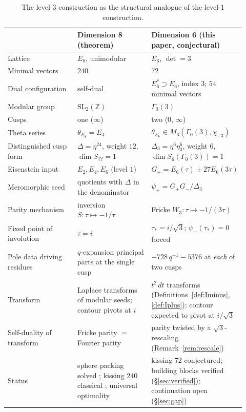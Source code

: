 \documentclass[11pt,reqno]{amsart}
\theoremstyle{plain}
\theoremstyle{definition}
\theoremstyle{remark}
\newcommand{\Z}{\mathbb{Z}}
\newcommand{\Dthree}{\Delta_{3}}
\newcommand{\psip}{\psi_{+}}
\begin{document}
\begin{table}[ht]
\centering
\small
\begin{tabular}{>{\raggedright\arraybackslash}p{0.30\linewidth}
                >{\raggedright\arraybackslash}p{0.32\linewidth}
                >{\raggedright\arraybackslash}p{0.30\linewidth}}
\toprule
 & \textbf{Dimension 8} (theorem) & \textbf{Dimension 6} (this paper,
conjectural) \\
\midrule
Lattice & $E_8$, unimodular & $E_6$, $\det=3$ \\
Minimal vectors & $240$ & $72$ \\
Dual configuration & self-dual & $E_6^*\supset E_6$, index $3$;
$54$ minimal vectors \\
Modular group & $\mathrm{SL}_2(\Z)$ & $\Gamma_0(3)$ \\
Cusps & one ($\infty$) & two ($0$, $\infty$) \\
Theta series & $\theta_{E_8}=E_4$ & $\theta_{E_6}\in
M_3(\Gamma_0(3),\chi_{-3})$ \\
Distinguished cusp form & $\Delta=\eta^{24}$, weight $12$,
$\dim S_{12}=1$ & $\Dthree=\eta^6\eta_3^6$, weight $6$,
$\dim S_6(\Gamma_0(3))=1$ \\
Eisenstein input & $E_2,E_4,E_6$ (level $1$) &
$G_\pm=E_6(\tau)\pm27E_6(3\tau)$ \\
Meromorphic seed & quotients with $\Delta$ in the denominator &
$\psip=G_+G_-/\Dthree$ \\
Parity mechanism & inversion $S:\tau\mapsto-1/\tau$ &
Fricke $W_3:\tau\mapsto-1/(3\tau)$ \\
Fixed point of involution & $\tau=i$ & $\tau_*=i/\sqrt3$;
$\psip(\tau_*)=0$ forced \\
Pole data driving residues & $q$-expansion principal parts at the
single cusp & $-728\,q^{-1}-5376$ at \emph{each} of two cusps \\
Transform & Laplace transforms of modular seeds; contour pivots at
$i$ & $t^2\,dt$ transforms (Definitions~\ref{def:Iminus},
\ref{def:Iplus}); contour expected to pivot at $i/\sqrt3$ \\
Self-duality of transform & Fricke parity $=$ Fourier parity &
parity twisted by a $\sqrt3$-rescaling
(Remark~\ref{rem:rescale}) \\
Status & sphere packing solved \cite{Viazovska2017}; kissing $240$
classical \cite{Levenshtein1979,OdlyzkoSloane1979}; universal
optimality \cite{CKMRV2022} & kissing $72$ conjectured; building
blocks verified (\S\ref{sec:verified}); continuation open
(\S\ref{sec:gap}) \\
\bottomrule
\end{tabular}
\medskip
\caption{The level-$3$ construction as the structural analogue of the
level-$1$ construction.}
\label{tab:compare}
\end{table}
\end{document}

